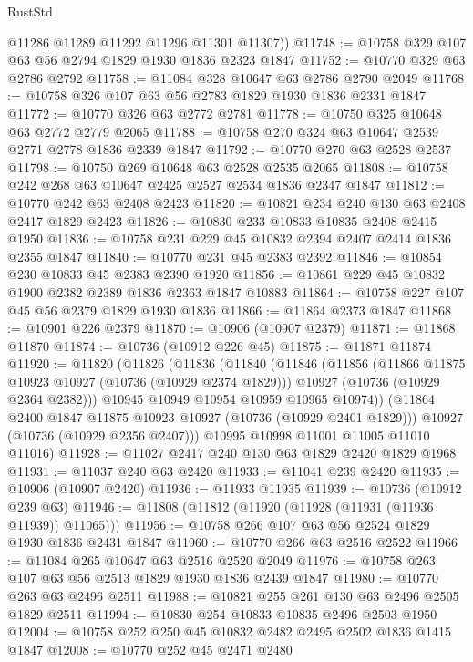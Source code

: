 \begin{lexlean}{RustStd}
\begin{coremodule}
        @11286
        @11289
        @11292
        @11296
        @11301
        @11307))
@11748 := @10758 @329 @107 @63 @56 @2794 @1829 @1930 @1836 @2323 @1847
@11752 := @10770 @329 @63 @2786 @2792
@11758 := @11084 @328 @10647 @63 @2786 @2790 @2049
@11768 := @10758 @326 @107 @63 @56 @2783 @1829 @1930 @1836 @2331 @1847
@11772 := @10770 @326 @63 @2772 @2781
@11778 := @10750 @325 @10648 @63 @2772 @2779 @2065
@11788 := @10758 @270 @324 @63 @10647 @2539 @2771 @2778 @1836 @2339 @1847
@11792 := @10770 @270 @63 @2528 @2537
@11798 := @10750 @269 @10648 @63 @2528 @2535 @2065
@11808 := @10758 @242 @268 @63 @10647 @2425 @2527 @2534 @1836 @2347 @1847
@11812 := @10770 @242 @63 @2408 @2423
@11820 := @10821 @234 @240 @130 @63 @2408 @2417 @1829 @2423
@11826 := @10830 @233 @10833 @10835 @2408 @2415 @1950
@11836 := @10758 @231 @229 @45 @10832 @2394 @2407 @2414 @1836 @2355 @1847
@11840 := @10770 @231 @45 @2383 @2392
@11846 := @10854 @230 @10833 @45 @2383 @2390 @1920
@11856 := @10861 @229 @45 @10832 @1900 @2382 @2389 @1836 @2363 @1847 @10883
@11864 := @10758 @227 @107 @45 @56 @2379 @1829 @1930 @1836
@11866 := @11864 @2373 @1847
@11868 := @10901 @226 @2379
@11870 := @10906 (@10907 @2379)
@11871 := @11868 @11870
@11874 := @10736 (@10912 @226 @45)
@11875 := @11871 @11874
@11920 := @11820
    (@11826
      (@11836
        (@11840
          (@11846
            (@11856
              (@11866 @11875 @10923 @10927 (@10736 (@10929 @2374 @1829)))
              @10927
              (@10736 (@10929 @2364 @2382)))
            @10945
            @10949
            @10954
            @10959
            @10965
            @10974))
        (@11864 @2400 @1847 @11875 @10923 @10927 (@10736 (@10929 @2401 @1829)))
        @10927
        (@10736 (@10929 @2356 @2407)))
      @10995
      @10998
      @11001
      @11005
      @11010
      @11016)
@11928 := @11027 @2417 @240 @130 @63 @1829 @2420 @1829 @1968
@11931 := @11037 @240 @63 @2420
@11933 := @11041 @239 @2420
@11935 := @10906 (@10907 @2420)
@11936 := @11933 @11935
@11939 := @10736 (@10912 @239 @63)
@11946 := @11808 (@11812 (@11920 (@11928 (@11931 (@11936 @11939)) @11065)))
@11956 := @10758 @266 @107 @63 @56 @2524 @1829 @1930 @1836 @2431 @1847
@11960 := @10770 @266 @63 @2516 @2522
@11966 := @11084 @265 @10647 @63 @2516 @2520 @2049
@11976 := @10758 @263 @107 @63 @56 @2513 @1829 @1930 @1836 @2439 @1847
@11980 := @10770 @263 @63 @2496 @2511
@11988 := @10821 @255 @261 @130 @63 @2496 @2505 @1829 @2511
@11994 := @10830 @254 @10833 @10835 @2496 @2503 @1950
@12004 := @10758 @252 @250 @45 @10832 @2482 @2495 @2502 @1836 @1415 @1847
@12008 := @10770 @252 @45 @2471 @2480

\end{coremodule}
\end{lexlean}

